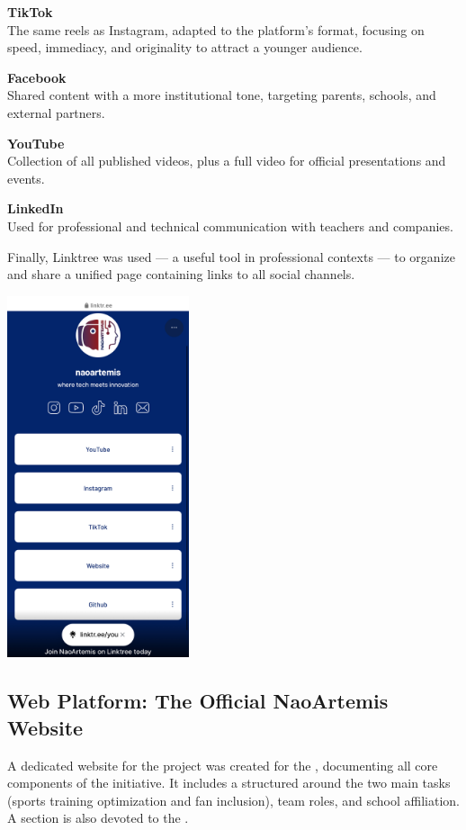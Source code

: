 \documentclass{optica-article}
\begin{document}
\textbf{TikTok}\\
The same reels as Instagram, adapted to the platform’s format, focusing on speed, immediacy, and originality to attract a younger audience.

\textbf{Facebook}\\
Shared content with a more institutional tone, targeting parents, schools, and external partners.

\textbf{YouTube}\\
Collection of all published videos, plus a full video for official presentations and events.

\textbf{LinkedIn}\\
Used for professional and technical communication with teachers and companies.

Finally, Linktree was used — a useful tool in professional contexts — to organize and share a unified page containing links to all social channels.

\begin{center}
    \includegraphics[width=0.4\textwidth]{figures/linktree.jpg}
\end{center}

\subsection{Web Platform: The Official NaoArtemis Website}

A dedicated website for the  project was created for the , documenting all core components of the initiative. It includes a  structured around the two main tasks (sports training optimization and fan inclusion), team roles, and school affiliation. A section is also devoted to the .
\bigskip
\end{document}
